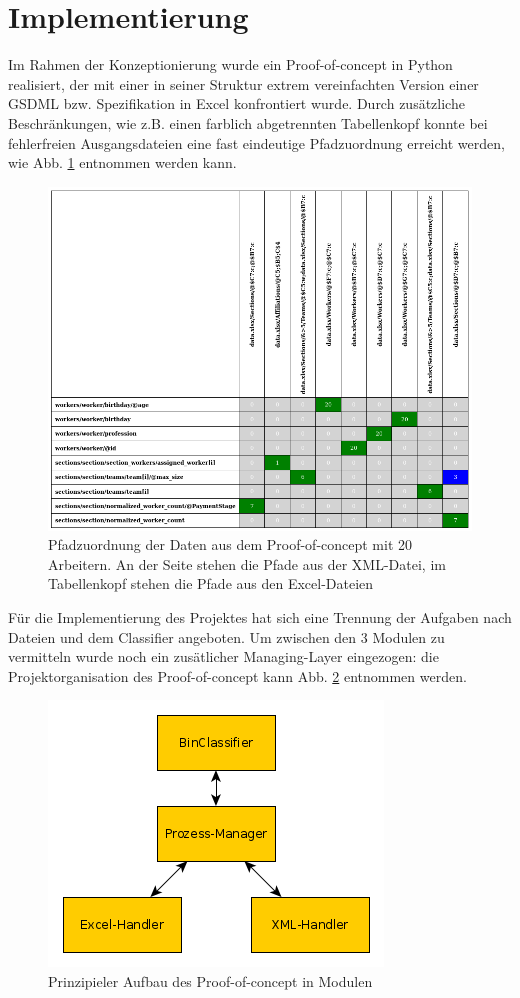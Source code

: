 \documentclass[a4paper,10pt]{article}
\begin{document}
\section{Implementierung}
Im Rahmen der Konzeptionierung wurde ein Proof-of-concept in Python realisiert, der mit einer in seiner Struktur
extrem vereinfachten Version einer GSDML bzw. Spezifikation in Excel konfrontiert wurde. Durch zusätzliche
Beschränkungen, wie z.B. einen farblich abgetrennten Tabellenkopf konnte bei fehlerfreien Ausgangsdateien eine
fast eindeutige Pfadzuordnung erreicht werden, wie Abb. \ref{classifier_ex} entnommen werden kann.
\begin{figure}[h]
 \centering
 \includegraphics[scale=0.4]{example_table}
 \caption{Pfadzuordnung der Daten aus dem Proof-of-concept mit 20 Arbeitern. An der Seite stehen die Pfade aus
          der XML-Datei, im Tabellenkopf stehen die Pfade aus den Excel-Dateien}
 \label{classifier_ex}
\end{figure}
Für die Implementierung des Projektes hat sich eine Trennung der Aufgaben nach Dateien und dem Classifier angeboten.
Um zwischen den 3 Modulen zu vermitteln wurde noch ein zusätlicher Managing-Layer eingezogen: die Projektorganisation des Proof-of-concept kann Abb. \ref{project_structure} entnommen werden.
\begin{figure}
 \centering
 \includegraphics[scale=0.5]{ProjektStruktur}
 \caption{Prinzipieler Aufbau des Proof-of-concept in Modulen}
 \label{project_structure}
\end{figure}
\end{document}
